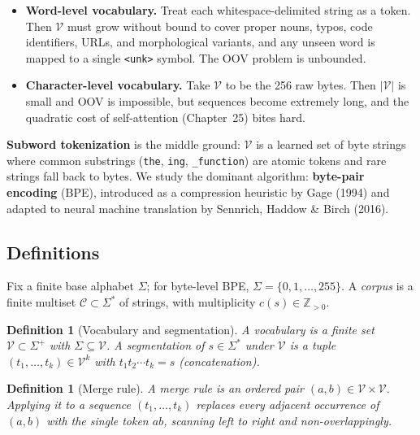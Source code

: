 \documentclass[11pt]{article}
\newtheorem{definition}[theorem]{Definition}
\theoremstyle{remark}
\begin{document}
\begin{itemize}
\item \textbf{Word-level vocabulary.} Treat each whitespace-delimited string as a token. Then $\mathcal{V}$ must grow without bound to cover proper nouns, typos, code identifiers, URLs, and morphological variants, and any unseen word is mapped to a single \texttt{<unk>} symbol. The OOV problem is unbounded.
\item \textbf{Character-level vocabulary.} Take $\mathcal{V}$ to be the 256 raw bytes. Then $|\mathcal{V}|$ is small and OOV is impossible, but sequences become extremely long, and the quadratic cost of self-attention (Chapter~25) bites hard.
\end{itemize}

\textbf{Subword tokenization} is the middle ground: $\mathcal{V}$ is a learned set of byte strings where common substrings (\texttt{the}, \texttt{ing}, \texttt{\_function}) are atomic tokens and rare strings fall back to bytes. We study the dominant algorithm: \textbf{byte-pair encoding} (BPE), introduced as a compression heuristic by Gage (1994) and adapted to neural machine translation by Sennrich, Haddow \& Birch (2016).

\subsection*{Definitions}

Fix a finite base alphabet $\Sigma$; for byte-level BPE, $\Sigma = \{0, 1, \dots, 255\}$. A \emph{corpus} is a finite multiset $\mathcal{C} \subset \Sigma^*$ of strings, with multiplicity $c(s) \in \mathbb{Z}_{>0}$.

\begin{definition}[Vocabulary and segmentation]
A \emph{vocabulary} is a finite set $\mathcal{V} \subset \Sigma^+$ with $\Sigma \subseteq \mathcal{V}$. A \emph{segmentation} of $s \in \Sigma^*$ under $\mathcal{V}$ is a tuple $(t_1, \dots, t_k) \in \mathcal{V}^k$ with $t_1 t_2 \cdots t_k = s$ (concatenation).
\end{definition}

\begin{definition}[Merge rule]
A \emph{merge rule} is an ordered pair $(a, b) \in \mathcal{V} \times \mathcal{V}$. Applying it to a sequence $(t_1, \dots, t_k)$ replaces every adjacent occurrence of $(a, b)$ with the single token $ab$, scanning left to right and non-overlappingly.
\end{definition}
\end{document}
